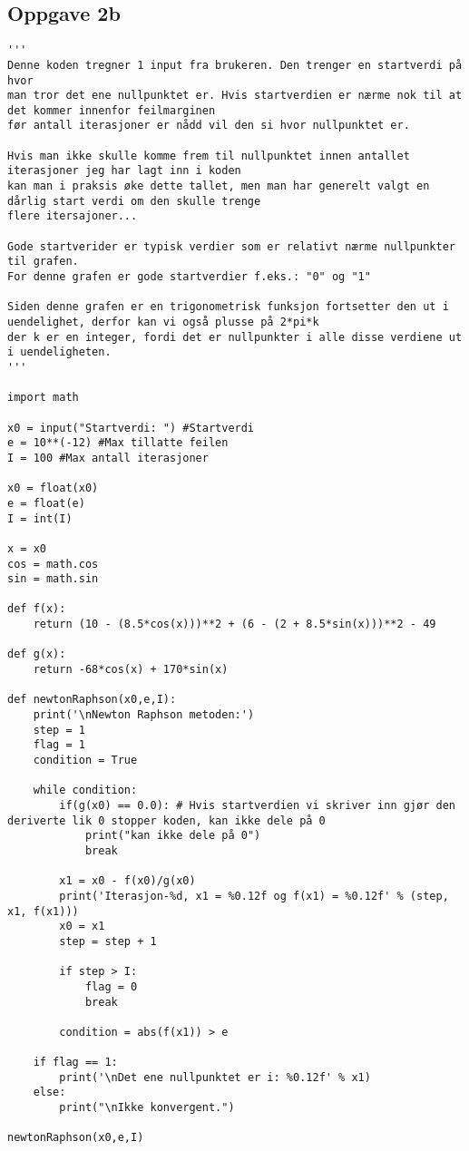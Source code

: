 \subsection{Oppgave 2b}
\begin{lstlisting}
'''
Denne koden tregner 1 input fra brukeren. Den trenger en startverdi på hvor
man tror det ene nullpunktet er. Hvis startverdien er nærme nok til at det kommer innenfor feilmarginen
før antall iterasjoner er nådd vil den si hvor nullpunktet er.

Hvis man ikke skulle komme frem til nullpunktet innen antallet iterasjoner jeg har lagt inn i koden
kan man i praksis øke dette tallet, men man har generelt valgt en dårlig start verdi om den skulle trenge
flere itersajoner...

Gode startverider er typisk verdier som er relativt nærme nullpunkter til grafen. 
For denne grafen er gode startverdier f.eks.: "0" og "1"

Siden denne grafen er en trigonometrisk funksjon fortsetter den ut i uendelighet, derfor kan vi også plusse på 2*pi*k
der k er en integer, fordi det er nullpunkter i alle disse verdiene ut i uendeligheten.
'''

import math

x0 = input("Startverdi: ") #Startverdi
e = 10**(-12) #Max tillatte feilen
I = 100 #Max antall iterasjoner

x0 = float(x0)
e = float(e)
I = int(I)

x = x0
cos = math.cos
sin = math.sin

def f(x):
    return (10 - (8.5*cos(x)))**2 + (6 - (2 + 8.5*sin(x)))**2 - 49

def g(x):
    return -68*cos(x) + 170*sin(x)

def newtonRaphson(x0,e,I):
    print('\nNewton Raphson metoden:')
    step = 1
    flag = 1
    condition = True

    while condition:
        if(g(x0) == 0.0): # Hvis startverdien vi skriver inn gjør den deriverte lik 0 stopper koden, kan ikke dele på 0
            print("kan ikke dele på 0")
            break
        
        x1 = x0 - f(x0)/g(x0)
        print('Iterasjon-%d, x1 = %0.12f og f(x1) = %0.12f' % (step, x1, f(x1)))
        x0 = x1
        step = step + 1

        if step > I:
            flag = 0
            break

        condition = abs(f(x1)) > e

    if flag == 1:
        print('\nDet ene nullpunktet er i: %0.12f' % x1)
    else:
        print("\nIkke konvergent.")

newtonRaphson(x0,e,I)
\end{lstlisting}

